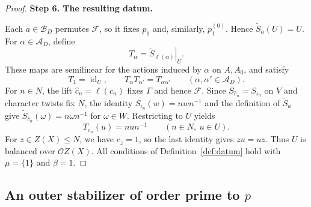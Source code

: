 \documentclass[11pt,a4paper]{article}
\theoremstyle{definition}
\theoremstyle{remark}
\numberwithin{equation}{section}
\newcommand{\cO}{\mathcal{O}}
\DeclareMathOperator{\id}{id}
\newcommand{\proofstep}[1]{%
	\par\addvspace{\medskipamount}%
	\noindent\textbf{#1}\par\nobreak
	\smallskip\nobreak\noindent\ignorespaces
}
\begin{document}
\begin{proof}
		\proofstep{Step 6. The resulting datum.}
		Each $a\in\mathcal B_D$ permutes $\mathcal F$, so it fixes $p_1$
		and, similarly, $p_1^{(0)}$. Hence $\widetilde S_a(U)=U$.
		For $\alpha\in\mathcal A_D$, define
		\[
		T_\alpha=\left.\widetilde S_{\ell(\alpha)}\right|_U.
		\]
		These maps are semilinear for the actions induced by $\alpha$ on
		$A,A_0$, and satisfy
		\[
		T_1=\id_U,\qquad T_\alpha T_{\alpha'}=T_{\alpha\alpha'}
		\qquad(\alpha,\alpha'\in\mathcal A_D).
		\]
		For $n\in N$, the lift $\widehat c_n=\ell(c_n)$ fixes $\Gamma$
		and hence $\mathcal F$. Since $S_{\widehat c_n}=S_{\iota_n}$ on $V$
		and character twists fix $N$, the identity
		$S_{\iota_n}(w)=nwn^{-1}$ and the definition of $\widetilde S_a$ give
		$\widetilde S_{\widehat c_n}(\omega)=n\omega n^{-1}$ for $\omega\in W$.
		Restricting to $U$ yields
		\[
		T_{c_n}(u)=nun^{-1}\qquad(n\in N,\ u\in U).
		\]
		For $z\in Z(X)\leq N$, we have $c_z=1$, so the last identity gives
		$zu=uz$. Thus $U$ is balanced over $\cO Z(X)$.
		All conditions of Definition~\ref{def:datum} hold with
		$\mu=\{1\}$ and $\beta=1$.
	\end{proof}
	
	\subsection{An outer stabilizer of order prime to \texorpdfstring{$p$}{p}}
	
\end{document}
